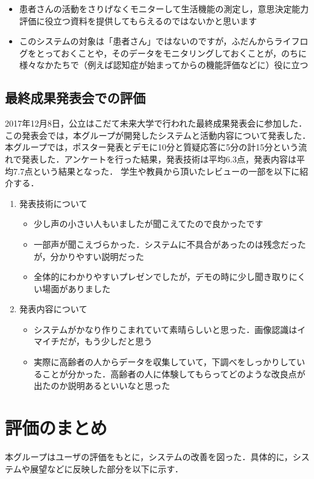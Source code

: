 \documentclass[../report]{subfiles}
\begin{document}
\begin{itemize}
    \item 患者さんの活動をさりげなくモニターして生活機能の測定し，意思決定能力評価に役立つ資料を提供してもらえるのではないかと思います
    \item このシステムの対象は「患者さん」ではないのですが，ふだんからライフログをとっておくことや，そのデータをモニタリングしておくことが，のちに様々なかたちで（例えば認知症が始まってからの機能評価などに）役に立つ
\end{itemize}

\subsection{最終成果発表会での評価}
2017年12月8日，公立はこだて未来大学で行われた最終成果発表会に参加した．
この発表会では，本グループが開発したシステムと活動内容について発表した．
本グループでは，ポスター発表とデモに10分と質疑応答に5分の計15分という流れで発表した．アンケートを行った結果，発表技術は平均6.3点，発表内容は平均7.7点という結果となった．
学生や教員から頂いたレビューの一部を以下に紹介する．

\begin{enumerate}
    \item[] 発表技術について
    \begin{itemize}
        \item 少し声の小さい人もいましたが聞こえてたので良かったです
        \item 一部声が聞こえづらかった．システムに不具合があったのは残念だったが，分かりやすい説明だった
        \item 全体的にわかりやすいプレゼンでしたが，デモの時に少し聞き取りにくい場面がありました
    \end{itemize}

    \item[] 発表内容について
    \begin{itemize}
        \item システムがかなり作りこまれていて素晴らしいと思った．画像認識はイマイチだが，もう少しだと思う
        \item 実際に高齢者の人からデータを収集していて，下調べをしっかりしていることが分かった．高齢者の人に体験してもらってどのような改良点が出たのか説明あるといいなと思った
    \end{itemize}
\end{enumerate}


\section{評価のまとめ}
本グループはユーザの評価をもとに，システムの改善を図った．具体的に，システムや展望などに反映した部分を以下に示す．
\end{document}
